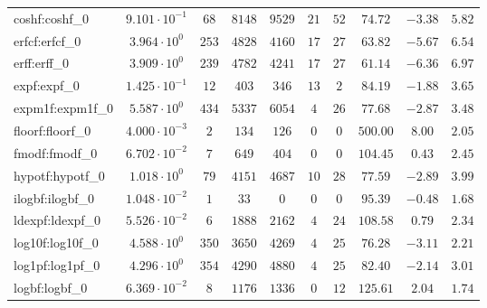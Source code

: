 \begin{tabular}{|l|c|c|c|c|c|c|c|c|c|}
coshf:coshf\_0               & $ 9.101 \cdot 10^{-1} $ & $ 68     $ & $ 8148   $ & $ 9529   $ & $ 21  $ & $ 52  $ & $ 74.72       $ & $ -3.38   $ & $ 5.82    $ \\
erfcf:erfcf\_0               & $ 3.964 \cdot 10^{0}  $ & $ 253    $ & $ 4828   $ & $ 4160   $ & $ 17  $ & $ 27  $ & $ 63.82       $ & $ -5.67   $ & $ 6.54    $ \\
erff:erff\_0                 & $ 3.909 \cdot 10^{0}  $ & $ 239    $ & $ 4782   $ & $ 4241   $ & $ 17  $ & $ 27  $ & $ 61.14       $ & $ -6.36   $ & $ 6.97    $ \\
expf:expf\_0                 & $ 1.425 \cdot 10^{-1} $ & $ 12     $ & $ 403    $ & $ 346    $ & $ 13  $ & $ 2   $ & $ 84.19       $ & $ -1.88   $ & $ 3.65    $ \\
expm1f:expm1f\_0             & $ 5.587 \cdot 10^{0}  $ & $ 434    $ & $ 5337   $ & $ 6054   $ & $ 4   $ & $ 26  $ & $ 77.68       $ & $ -2.87   $ & $ 3.48    $ \\
floorf:floorf\_0             & $ 4.000 \cdot 10^{-3} $ & $ 2      $ & $ 134    $ & $ 126    $ & $ 0   $ & $ 0   $ & $ 500.00      $ & $ 8.00    $ & $ 2.05    $ \\
fmodf:fmodf\_0               & $ 6.702 \cdot 10^{-2} $ & $ 7      $ & $ 649    $ & $ 404    $ & $ 0   $ & $ 0   $ & $ 104.45      $ & $ 0.43    $ & $ 2.45    $ \\
hypotf:hypotf\_0             & $ 1.018 \cdot 10^{0}  $ & $ 79     $ & $ 4151   $ & $ 4687   $ & $ 10  $ & $ 28  $ & $ 77.59       $ & $ -2.89   $ & $ 3.99    $ \\
ilogbf:ilogbf\_0             & $ 1.048 \cdot 10^{-2} $ & $ 1      $ & $ 33     $ & $ 0      $ & $ 0   $ & $ 0   $ & $ 95.39       $ & $ -0.48   $ & $ 1.68    $ \\
ldexpf:ldexpf\_0             & $ 5.526 \cdot 10^{-2} $ & $ 6      $ & $ 1888   $ & $ 2162   $ & $ 4   $ & $ 24  $ & $ 108.58      $ & $ 0.79    $ & $ 2.34    $ \\
log10f:log10f\_0             & $ 4.588 \cdot 10^{0}  $ & $ 350    $ & $ 3650   $ & $ 4269   $ & $ 4   $ & $ 25  $ & $ 76.28       $ & $ -3.11   $ & $ 2.21    $ \\
log1pf:log1pf\_0             & $ 4.296 \cdot 10^{0}  $ & $ 354    $ & $ 4290   $ & $ 4880   $ & $ 4   $ & $ 25  $ & $ 82.40       $ & $ -2.14   $ & $ 3.01    $ \\
logbf:logbf\_0               & $ 6.369 \cdot 10^{-2} $ & $ 8      $ & $ 1176   $ & $ 1336   $ & $ 0   $ & $ 12  $ & $ 125.61      $ & $ 2.04    $ & $ 1.74    $ \\

\end{tabular}
